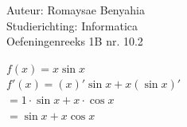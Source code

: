 \documentclass[a4paper]{article}
\begin{document}
\noindent \large Auteur: Romaysae Benyahia \\
\noindent \large Studierichting: Informatica\\
\noindent \large Oefeningenreeks 1B nr. 10.2\\

\medskip
\normalsize

$f(x)=x\sin x$\\

$f'(x)=(x)'\sin x + x(\sin x)'$\\

$=1\cdot\sin x + x\cdot\cos x$\\

$=\sin x + x\cos x$\\
\end{document}
